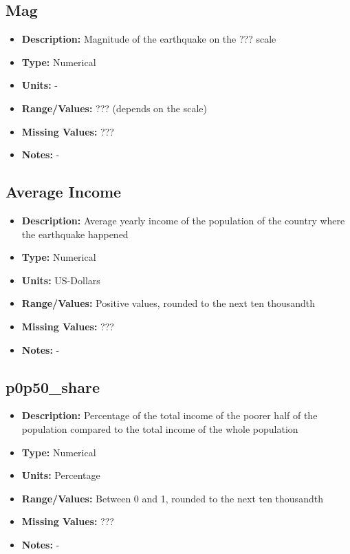\documentclass{article}
\begin{document}
\subsection{Mag}
\begin{itemize}
    \item \textbf{Description:} Magnitude of the earthquake on the ??? scale
    \item \textbf{Type:} Numerical
    \item \textbf{Units:} -
    \item \textbf{Range/Values:} ??? (depends on the scale)
    \item \textbf{Missing Values:} ???
    \item \textbf{Notes:} -
\end{itemize}

\subsection{Average Income}
\begin{itemize}
    \item \textbf{Description:} Average yearly income of the population of the country where the earthquake happened
    \item \textbf{Type:} Numerical
    \item \textbf{Units:} US-Dollars
    \item \textbf{Range/Values:} Positive values, rounded to the next ten thousandth
    \item \textbf{Missing Values:} ???
    \item \textbf{Notes:} -
\end{itemize}

\subsection{p0p50\_share}
\begin{itemize}
    \item \textbf{Description:} Percentage of the total income of the poorer half of the population compared to the total income of the whole population
    \item \textbf{Type:} Numerical
    \item \textbf{Units:} Percentage
    \item \textbf{Range/Values:} Between 0 and 1, rounded to the next ten thousandth
    \item \textbf{Missing Values:} ???
    \item \textbf{Notes:} -
\end{itemize}
\end{document}
